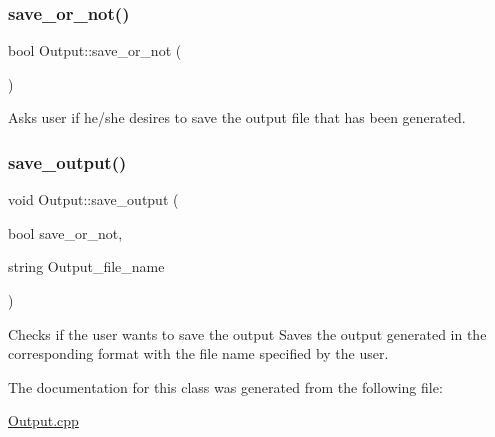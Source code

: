 \subsubsection{\texorpdfstring{save\+\_\+or\+\_\+not()}{save\_or\_not()}}
{\footnotesize\ttfamily bool Output\+::save\+\_\+or\+\_\+not (\begin{DoxyParamCaption}{ }\end{DoxyParamCaption})\hspace{0.3cm}{\ttfamily [inline]}}

Asks user if he/she desires to save the output file that has been generated.\mbox{\label{classOutput_add61bdc5030a63a127ad67e70288a3e9}} 
\subsubsection{\texorpdfstring{save\+\_\+output()}{save\_output()}}
{\footnotesize\ttfamily void Output\+::save\+\_\+output (\begin{DoxyParamCaption}\item[{bool}]{save\+\_\+or\+\_\+not,  }\item[{string}]{Output\+\_\+file\+\_\+name }\end{DoxyParamCaption})\hspace{0.3cm}{\ttfamily [inline]}}

Checks if the user wants to save the output Saves the output generated in the corresponding format with the file name specified by the user.

The documentation for this class was generated from the following file\+:\begin{DoxyCompactItemize}
\item 
\hyperlink{Output_8cpp}{Output.\+cpp}\end{DoxyCompactItemize}
